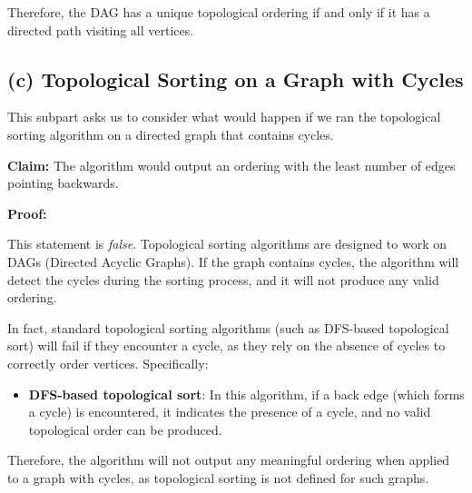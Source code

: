 \documentclass[11pt]{article}
\begin{document}
Therefore, the DAG has a unique topological ordering if and only if it has a directed path visiting all vertices.

\subsection*{(c) Topological Sorting on a Graph with Cycles}

This subpart asks us to consider what would happen if we ran the topological sorting algorithm on a directed graph that contains cycles.

\textbf{Claim:} The algorithm would output an ordering with the least number of edges pointing backwards.

\textbf{Proof:}

This statement is \emph{false}. Topological sorting algorithms are designed to work on DAGs (Directed Acyclic Graphs). If the graph contains cycles, the algorithm will detect the cycles during the sorting process, and it will not produce any valid ordering.

In fact, standard topological sorting algorithms (such as DFS-based topological sort) will fail if they encounter a cycle, as they rely on the absence of cycles to correctly order vertices. Specifically:
\begin{itemize}
    \item \textbf{DFS-based topological sort}: In this algorithm, if a back edge (which forms a cycle) is encountered, it indicates the presence of a cycle, and no valid topological order can be produced.
\end{itemize}

Therefore, the algorithm will not output any meaningful ordering when applied to a graph with cycles, as topological sorting is not defined for such graphs.
\end{document}
